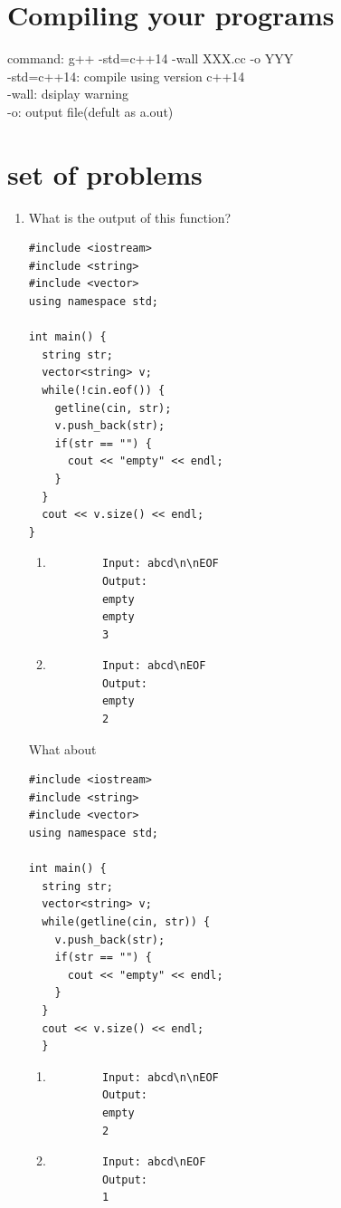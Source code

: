 \documentclass[12pt]{article}
\begin{document}
\section{Compiling your programs}
command: g++ -std=c++14 -wall XXX.cc -o YYY\\
-std=c++14: compile using version c++14\\
-wall: dsiplay warning\\
-o: output file(defult as a.out)

\section{set of problems}
\begin{enumerate}
    \item What is the output of this function?
    \begin{verbatim}
#include <iostream>
#include <string>
#include <vector>
using namespace std;

int main() {
  string str;
  vector<string> v;
  while(!cin.eof()) {
    getline(cin, str);
    v.push_back(str);
    if(str == "") {
      cout << "empty" << endl;
    }
  }
  cout << v.size() << endl;
}
    \end{verbatim}

    \begin{enumerate}
        \item
        \begin{verbatim}
        Input: abcd\n\nEOF   
        Output:
        empty
        empty
        3
        \end{verbatim}
        \item
        \begin{verbatim}
        Input: abcd\nEOF   
        Output:
        empty
        2
        \end{verbatim}
    \end{enumerate}
    What about
    \begin{verbatim}
#include <iostream>
#include <string>
#include <vector>
using namespace std;
        
int main() {
  string str;
  vector<string> v;
  while(getline(cin, str)) {
    v.push_back(str);
    if(str == "") {
      cout << "empty" << endl;
    }
  }
  cout << v.size() << endl;
  }
    \end{verbatim}

    \begin{enumerate}
        \item
        \begin{verbatim}
        Input: abcd\n\nEOF   
        Output:
        empty
        2
        \end{verbatim}
        \item
        \begin{verbatim}
        Input: abcd\nEOF   
        Output:
        1
        \end{verbatim}
    \end{enumerate}


\end{enumerate}
\end{document}
